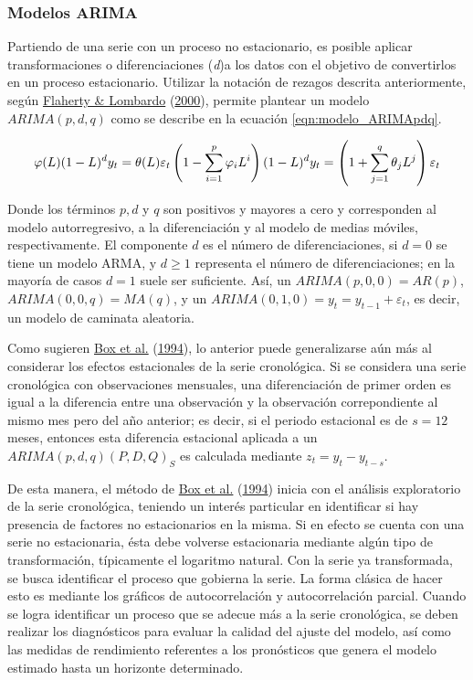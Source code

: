 \documentclass[
]{article}
\begin{document}
\subsubsection{Modelos ARIMA}

Partiendo de una serie con un proceso no estacionario, es posible
aplicar transformaciones o diferenciaciones (\emph{d})a los datos con el
objetivo de convertirlos en un proceso estacionario. Utilizar la
notación de rezagos descrita anteriormente, según
\protect\hyperlink{ref-Lombardo}{Flaherty \& Lombardo}
(\protect\hyperlink{ref-Lombardo}{2000}), permite plantear un modelo
\(ARIMA(p,d,q)\) como se describe en la ecuación
\ref{eqn:modelo_ARIMApdq}.

\begin{equation}
\label{eqn:modelo_ARIMApdq}
\varphi(L)(1-L)^dy_t=\theta(L)\varepsilon_t\\
\left(1-\sum_{i=1}^p \varphi_iL^i \right)(1-L)^d y_t=\left(1+\sum_{j=1}^q \theta_jL^j \right) \varepsilon_t
\end{equation}

Donde los términos \(p, d\) y \(q\) son positivos y mayores a cero y
corresponden al modelo autorregresivo, a la diferenciación y al modelo
de medias móviles, respectivamente. El componente \(d\) es el número de
diferenciaciones, si \(d=0\) se tiene un modelo ARMA, y \(d\geq1\)
representa el número de diferenciaciones; en la mayoría de casos \(d=1\)
suele ser suficiente. Así, un \(ARIMA(p,0,0)=AR(p)\),
\(ARIMA(0,0,q)=MA(q)\), y un \(ARIMA(0,1,0)=y_t=y_{t-1}+\varepsilon_t\),
es decir, un modelo de caminata aleatoria.

Como sugieren \protect\hyperlink{ref-box-jenkins}{Box et al.}
(\protect\hyperlink{ref-box-jenkins}{1994}), lo anterior puede
generalizarse aún más al considerar los efectos estacionales de la serie
cronológica. Si se considera una serie cronológica con observaciones
mensuales, una diferenciación de primer orden es igual a la diferencia
entre una observación y la observación correpondiente al mismo mes pero
del año anterior; es decir, si el periodo estacional es de \(s=12\)
meses, entonces esta diferencia estacional aplicada a un
\(ARIMA(p,d,q)(P,D,Q)_S\) es calculada mediante \(z_t=y_t-y_{t-s}\).

De esta manera, el método de \protect\hyperlink{ref-box-jenkins}{Box et
al.} (\protect\hyperlink{ref-box-jenkins}{1994}) inicia con el análisis
exploratorio de la serie cronológica, teniendo un interés particular en
identificar si hay presencia de factores no estacionarios en la misma.
Si en efecto se cuenta con una serie no estacionaria, ésta debe volverse
estacionaria mediante algún tipo de transformación, típicamente el
logaritmo natural. Con la serie ya transformada, se busca identificar el
proceso que gobierna la serie. La forma clásica de hacer esto es
mediante los gráficos de autocorrelación y autocorrelación parcial.
Cuando se logra identificar un proceso que se adecue más a la serie
cronológica, se deben realizar los diagnósticos para evaluar la calidad
del ajuste del modelo, así como las medidas de rendimiento referentes a
los pronósticos que genera el modelo estimado hasta un horizonte
determinado.
\end{document}
